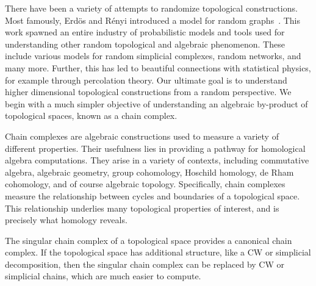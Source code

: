 There have been a variety of attempts to randomize topological constructions.
Most famously, Erd\"os and R\'enyi introduced a model for random
graphs~\cite{erdos_random_1959, erdos_evolution_1960}.  This work spawned an
entire industry of probabilistic models and tools used for understanding other
random topological and algebraic phenomenon. These include various models for
random simplicial complexes, random networks, and many more. Further, this has
led to beautiful connections with statistical physics, for example through
percolation theory.  Our ultimate goal 
is to understand higher dimensional topological constructions from a random perspective. We 
begin with a much simpler objective of understanding an algebraic
by-product of topological spaces, known as a chain complex. 

Chain complexes are algebraic constructions used to measure a variety of
different properties. Their usefulness lies in providing a pathway for
homological algebra computations. They arise in a variety of contexts,
including commutative algebra, algebraic geometry, group cohomology, Hoschild homology, de Rham
cohomology, and of course algebraic topology. Specifically, chain
complexes measure the relationship between cycles and boundaries of a
topological space. This relationship underlies many topological properties of
interest, and is precisely what homology reveals. 

The singular chain complex of a topological space provides a canonical
chain complex.
If the topological space has additional structure, like a CW or 
simplicial decomposition, then the singular chain complex can be replaced
by CW or simplicial chains, which are much easier to compute.



%


